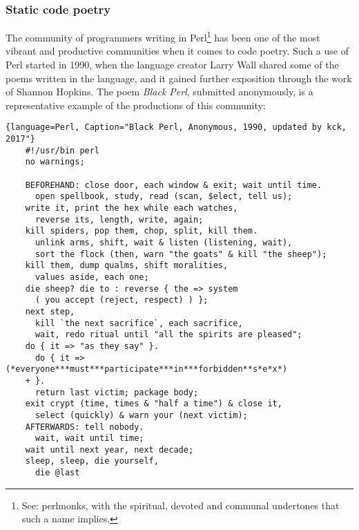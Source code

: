 \documentclass{article}
\begin{document}
\subsubsection{Static code poetry}

The community of programmers writing in Perl\footnote{See: perlmonks, with the spiritual, devoted and communal undertones that such a name implies.} has been one of the most vibrant and productive communities when it comes to code poetry. Such a use of Perl started in 1990, when the language creator Larry Wall shared some of the poems written in the language, and it gained further exposition through the work of Shannon Hopkins\cite{hopkins_camels_1992}. The poem \emph{Black Perl}, submitted anonymously, is a representative example of the productions of this community:

\linespread{1.00}\selectfont
\begin{lstlisting}{language=Perl, Caption="Black Perl, Anonymous, 1990, updated by kck, 2017"}
    #!/usr/bin perl
    no warnings;
    
    BEFOREHAND: close door, each window & exit; wait until time.
      open spellbook, study, read (scan, $elect, tell us);
    write it, print the hex while each watches,
      reverse its, length, write, again;
    kill spiders, pop them, chop, split, kill them.
      unlink arms, shift, wait & listen (listening, wait),
      sort the flock (then, warn "the goats" & kill "the sheep");
    kill them, dump qualms, shift moralities,
      values aside, each one;
    die sheep? die to : reverse { the => system
      ( you accept (reject, respect) ) };
    next step,
      kill `the next sacrifice`, each sacrifice,
      wait, redo ritual until "all the spirits are pleased";
    do { it => "as they say" }.
      do { it => (*everyone***must***participate***in***forbidden**s*e*x*)
    + }.
      return last victim; package body;
    exit crypt (time, times & "half a time") & close it,
      select (quickly) & warn your (next victim);
    AFTERWARDS: tell nobody.
      wait, wait until time;
    wait until next year, next decade;
    sleep, sleep, die yourself,
      die @last 
\end{lstlisting}
\linespread{1.50}\selectfont
\normalfont
\end{document}
